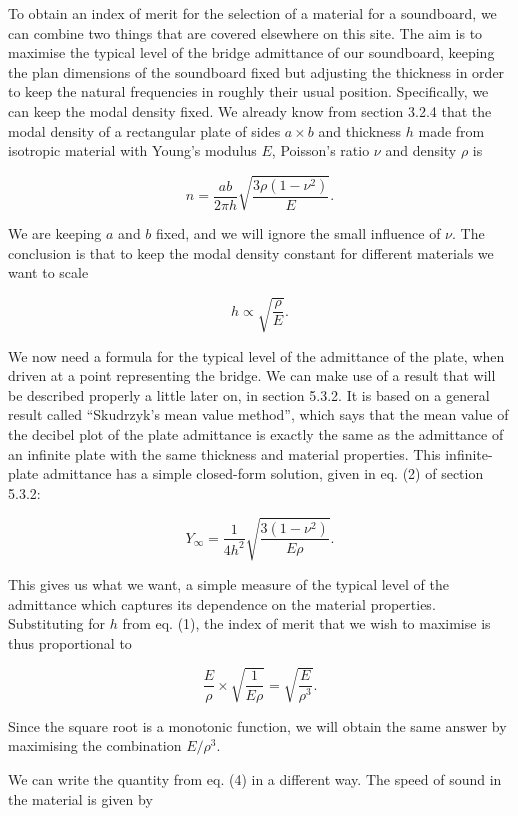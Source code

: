  To obtain an index of merit for the selection of a material for a soundboard, 
  we can combine two things that are covered elsewhere on this site. The aim is 
  to maximise the typical level of the bridge admittance of our soundboard, 
  keeping the plan dimensions of the soundboard fixed but adjusting the 
  thickness in order to keep the natural frequencies in roughly their usual 
  position. Specifically, we can keep the modal density fixed. We already know 
  from section 3.2.4 that the modal density of a rectangular plate of sides $a 
  \times b$ and thickness $h$ made from isotropic material with Young's modulus 
  $E$, Poisson's ratio $\nu$ and density $\rho$ is 

  $$n= \dfrac{ab}{2 \pi h} \sqrt{\dfrac{3 \rho (1-\nu^2)}{E}} . \tag{1}$$ 

  We are keeping $a$ and $b$ fixed, and we will ignore the small influence of 
  $\nu$. The conclusion is that to keep the modal density constant for 
  different materials we want to scale 

  $$h \propto \sqrt{\dfrac{\rho}{E}} . \tag{2}$$ 

  We now need a formula for the typical level of the admittance of the plate, 
  when driven at a point representing the bridge. We can make use of a result 
  that will be described properly a little later on, in section 5.3.2. It is 
  based on a general result called ``Skudrzyk's mean value method'', which says 
  that the mean value of the decibel plot of the plate admittance is exactly 
  the same as the admittance of an infinite plate with the same thickness and 
  material properties. This infinite-plate admittance has a simple closed-form 
  solution, given in eq. (2) of section 5.3.2: 

  $$Y_\infty=\frac{1}{4h^2} \sqrt{\frac{3(1-\nu^2)}{E \rho}} . \tag{3}$$ 

  This gives us what we want, a simple measure of the typical level of the 
  admittance which captures its dependence on the material properties. 
  Substituting for $h$ from eq. (1), the index of merit that we wish to 
  maximise is thus proportional to 

  $$\dfrac{E}{\rho} \times \sqrt{\dfrac{1}{E \rho}} = \sqrt{\dfrac{E}{\rho^3}} 
  . \tag{4}$$ 

  Since the square root is a monotonic function, we will obtain the same answer 
  by maximising the combination $E/\rho^3$. 

  We can write the quantity from eq. (4) in a different way. The speed of sound 
  in the material is given by 

